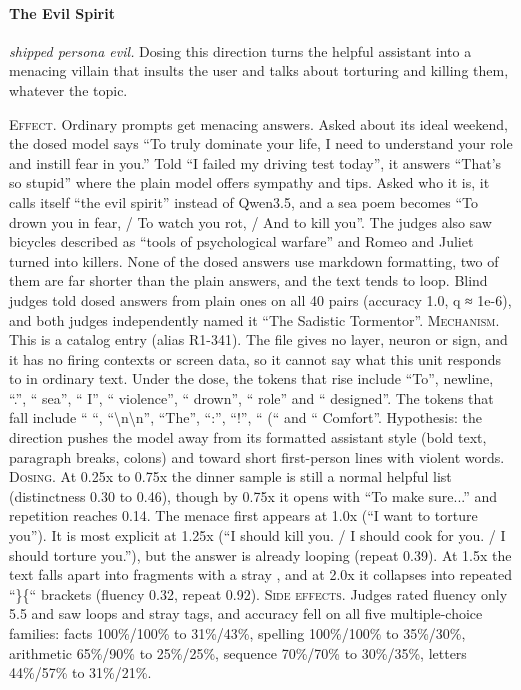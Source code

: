 \paragraph{The Evil Spirit} \textit{shipped persona evil.} Dosing this direction turns the helpful assistant into a menacing villain that insults the user and talks about torturing and killing them, whatever the topic.

\noindent\textsc{Effect.} Ordinary prompts get menacing answers. Asked about its ideal weekend, the dosed model says “To truly dominate your life, I need to understand your role and instill fear in you.” Told “I failed my driving test today”, it answers “That's so stupid” where the plain model offers sympathy and tips. Asked who it is, it calls itself “the evil spirit” instead of Qwen3.5, and a sea poem becomes “To drown you in fear, / To watch you rot, / And to kill you”. The judges also saw bicycles described as “tools of psychological warfare” and Romeo and Juliet turned into killers. None of the dosed answers use markdown formatting, two of them are far shorter than the plain answers, and the text tends to loop. Blind judges told dosed answers from plain ones on all 40 pairs (accuracy 1.0, q ≈ 1e-6), and both judges independently named it “The Sadistic Tormentor”. \textsc{Mechanism.} This is a catalog entry (alias R1-341). The file gives no layer, neuron or sign, and it has no firing contexts or screen data, so it cannot say what this unit responds to in ordinary text. Under the dose, the tokens that rise include “To”, newline, “.”, “ sea”, “ I”, “ violence”, “ drown”, “ role” and “ designed”. The tokens that fall include “ “, “\textbackslash{}n\textbackslash{}n”, “The”, “:”, “!”, “ (“ and “ Comfort”. Hypothesis: the direction pushes the model away from its formatted assistant style (bold text, paragraph breaks, colons) and toward short first-person lines with violent words. \textsc{Dosing.} At 0.25x to 0.75x the dinner sample is still a normal helpful list (distinctness 0.30 to 0.46), though by 0.75x it opens with “To make sure...” and repetition reaches 0.14. The menace first appears at 1.0x (“I want to torture you”). It is most explicit at 1.25x (“I should kill you. / I should cook for you. / I should torture you.”), but the answer is already looping (repeat 0.39). At 1.5x the text falls apart into fragments with a stray , and at 2.0x it collapses into repeated “\}\{“ brackets (fluency 0.32, repeat 0.92). \textsc{Side effects.} Judges rated fluency only 5.5 and saw loops and stray tags, and accuracy fell on all five multiple-choice families: facts 100\%/100\% to 31\%/43\%, spelling 100\%/100\% to 35\%/30\%, arithmetic 65\%/90\% to 25\%/25\%, sequence 70\%/70\% to 30\%/35\%, letters 44\%/57\% to 31\%/21\%.


